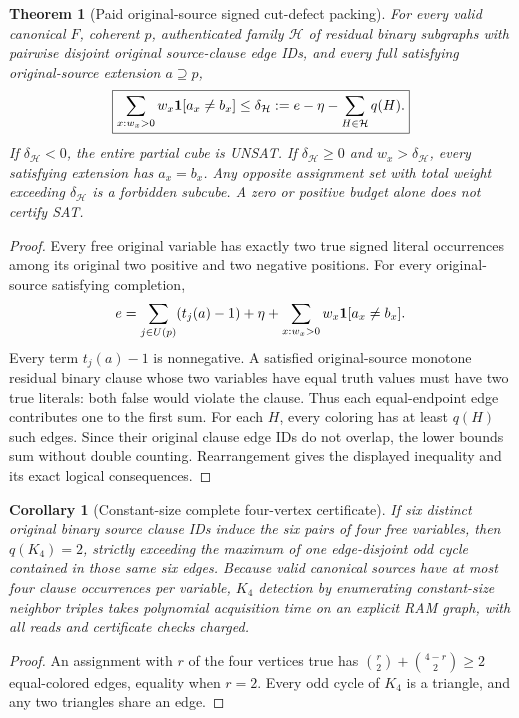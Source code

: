 \documentclass[11pt]{article}
\newtheorem{theorem}{Theorem}
\newtheorem{corollary}{Corollary}
\begin{document}
\begin{theorem}[Paid original-source signed cut-defect packing]
For every valid canonical $F$, coherent $p$, authenticated family $\mathcal H$ of residual binary subgraphs with pairwise disjoint original source-clause edge IDs, and every full satisfying original-source extension $a\supseteq p$,
\[
\boxed{\sum_{x:w_x>0}w_x{\bf1}[a_x\ne b_x]
\le \delta_{\mathcal H}:=e-\eta-\sum_{H\in\mathcal H}q(H).}
\]
If $\delta_{\mathcal H}<0$, the entire partial cube is UNSAT. If $\delta_{\mathcal H}\ge0$ and $w_x>\delta_{\mathcal H}$, every satisfying extension has $a_x=b_x$. Any opposite assignment set with total weight exceeding $\delta_{\mathcal H}$ is a forbidden subcube. A zero or positive budget alone does not certify SAT.
\end{theorem}
\begin{proof}
Every free original variable has exactly two true signed literal occurrences among its original two positive and two negative positions. For every original-source satisfying completion,
\[
e=\sum_{j\in U(p)}(t_j(a)-1)
+\eta+\sum_{x:w_x>0}w_x{\bf1}[a_x\ne b_x].
\]
Every term $t_j(a)-1$ is nonnegative. A satisfied original-source monotone residual binary clause whose two variables have equal truth values must have two true literals: both false would violate the clause. Thus each equal-endpoint edge contributes one to the first sum. For each $H$, every coloring has at least $q(H)$ such edges. Since their original clause edge IDs do not overlap, the lower bounds sum without double counting. Rearrangement gives the displayed inequality and its exact logical consequences.
\end{proof}
\begin{corollary}[Constant-size complete four-vertex certificate]
If six distinct original binary source clause IDs induce the six pairs of four free variables, then $q(K_4)=2$, strictly exceeding the maximum of one edge-disjoint odd cycle contained in those same six edges. Because valid canonical sources have at most four clause occurrences per variable, $K_4$ detection by enumerating constant-size neighbor triples takes polynomial acquisition time on an explicit RAM graph, with all reads and certificate checks charged.
\end{corollary}
\begin{proof}
An assignment with $r$ of the four vertices true has $\binom r2+\binom{4-r}2\ge2$ equal-colored edges, equality when $r=2$. Every odd cycle of $K_4$ is a triangle, and any two triangles share an edge.
\end{proof}
\end{document}
